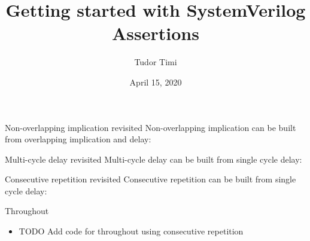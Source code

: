\documentclass{beamer}
\title{Getting started with SystemVerilog Assertions}
\author{Tudor Timi}
\institute{VerificationGentleman.com}
\date{April 15, 2020}
\begin{document}
\begin{frame}[fragile]{Non-overlapping implication revisited}
Non-overlapping implication can be built from overlapping implication and delay:

\pause
{}

\pause
{}

\pause
{}
\end{frame}


\begin{frame}[fragile]{Multi-cycle delay revisited}
Multi-cycle delay can be built from single cycle delay:

\pause
{}
\end{frame}


\begin{frame}[fragile]{Consecutive repetition revisited}
Consecutive repetition can be built from single cycle delay:

\pause
{}
\end{frame}


\begin{frame}{Throughout}
\begin{itemize}
 \item TODO Add code for throughout using consecutive repetition
\end{itemize}
\end{frame}
\end{document}
